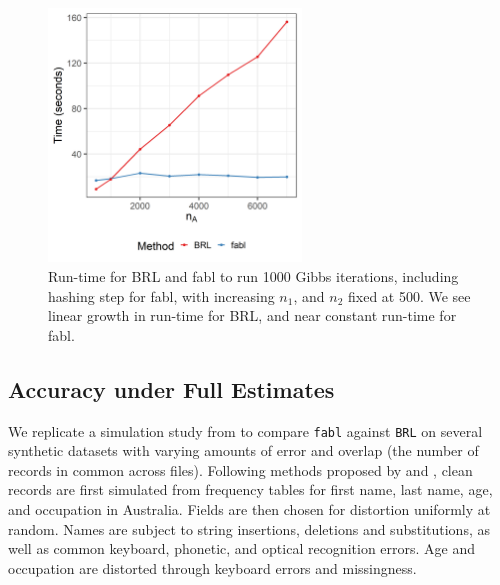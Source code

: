 \documentclass[ba]{imsart}
\begin{document}
	\begin{figure}[h!]
		\begin{center} \includegraphics[width=0.6\textwidth]{../notes/figures/speed_plot_fixed_nB_slides} 
			\caption{Run-time for BRL and fabl to run 1000 Gibbs iterations, including hashing step for fabl, with increasing $n_1$, and $n_2$ fixed at 500. We see linear growth in run-time for BRL, and near constant run-time for fabl.}\label{fig:speed2}
		\end{center}
	\end{figure}
	
	
	\hypertarget{accuracy}{%
		\subsection{Accuracy under Full Estimates}\label{accuracy}}
	
	We replicate a simulation study from \cite{sadinle_bayesian_2017} to compare \texttt{fabl} against \texttt{BRL} on several synthetic datasets with varying amounts of error and overlap (the number of records in common across files). Following methods proposed by \cite{christen_pudjijono2009} and \cite{christen_vatsalan2013}, clean records are first simulated from frequency tables for first name, last name, age, and occupation in Australia. Fields are then chosen for distortion uniformly at random. Names are subject to string insertions, deletions and substitutions, as well as common keyboard, phonetic, and optical recognition errors. Age and occupation are distorted through keyboard errors and missingness.
	
\end{document}
